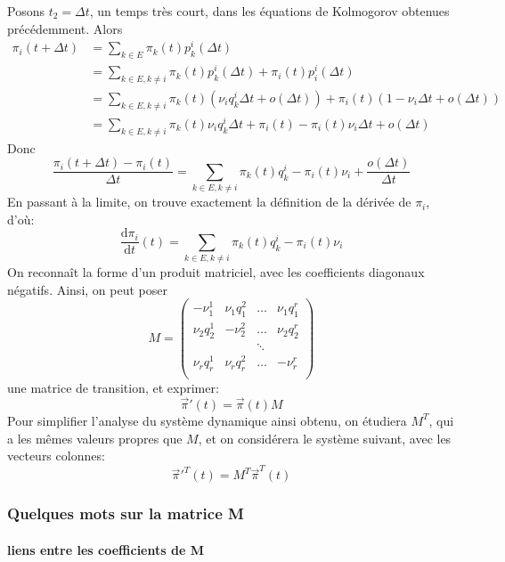 \documentclass[a4paper]{article}
\theoremstyle{plain}
\theoremstyle{definition}
\theoremstyle{remark}
\begin{document}
Posons $t_2=\Delta t$, un temps très court, dans les équations de Kolmogorov obtenues précédemment.
Alors 
\begin{align*}
\pi_i(t+\Delta t)&=\sum_{k\in E}\pi_k(t)p_k^i(\Delta t)\\
&=\sum_{k\in E,k\neq i}\pi_k(t)p_k^i(\Delta t)+\pi_i(t)p_i^i(\Delta t)\\
&=\sum_{k\in E,k\neq i}\pi_k(t)(\nu_iq_k^i\Delta t+o(\Delta t))+\pi_i(t)(1-\nu_i\Delta t+o(\Delta t))\\
&=\sum_{k\in E,k\neq i}\pi_k(t)\nu_iq_k^i\Delta t +\pi_i(t)-\pi_i(t)\nu_i\Delta t + o(\Delta t)
\end{align*}
Donc
$$
\frac{\pi_i(t+\Delta t)-\pi_i(t)}{\Delta t}=\sum_{k\in E,k\neq i}\pi_k(t)q_k^i-\pi_i(t)\nu_i+\frac{o(\Delta t)}{\Delta t}
$$
En passant à la limite, on trouve exactement la définition de la dérivée de $\pi_i$, d'où:
$$
\frac{\mathrm{d}\pi_i}{\mathrm{d}t}(t)=\sum_{k\in E,k\neq i}\pi_k(t)q_k^i-\pi_i(t)\nu_i
$$
On reconnaît la forme d'un produit matriciel, avec les coefficients diagonaux négatifs. Ainsi, on peut poser 
$$M=
\begin{pmatrix}
-\nu_1^1 & \nu_1q_1^2&\hdots&\nu_1q_1^r\\
\nu_2q_2^1& -\nu_2^2&\hdots&\nu_2q_2^r\\
&&\ddots\\
\nu_rq_r^1&\nu_rq_r^2&\hdots&-\nu_r^r\\
\end{pmatrix}
$$
une matrice de transition, et exprimer:
$$\vec{\pi}'(t)=\vec{\pi}(t)M$$
Pour simplifier l'analyse du système dynamique ainsi obtenu, on étudiera $M^T$, qui a les mêmes valeurs propres que $M$, et on considérera le système suivant, avec les vecteurs colonnes:
$$\vec{\pi}'^T(t)=M^T\vec{\pi}^T(t)$$
\subsubsection{Quelques mots sur la matrice M}
\paragraph{liens entre les coefficients de M}
\end{document}
